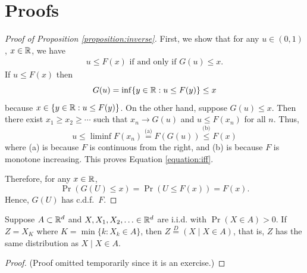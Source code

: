 \documentclass[12pt]{article}
\begin{document}
\appendix
\section*{Proofs}

\begin{proof}[Proof of Proposition \ref{proposition:inverse}]
First, we show that for any $u\in(0,1)$, $x\in\mathbb{R}$, we have 
\begin{align}\label{equation:iff}
u\leq F(x) \text{ if and only if } G(u)\leq x.
\end{align}
If $u\leq F(x)$ then
$$ G(u) =\inf\{y\in\mathbb{R}: u\leq F(y)\}\leq x $$
because $x\in\{y\in\mathbb{R}: u\leq F(y)\}$. On the other hand, suppose $G(u)\leq x$. Then there exist $x_1\geq x_2\geq \cdots$ such that $x_n\to G(u)$ and $u\leq F(x_n)$ for all $n$. Thus,
$$ u\leq\liminf F(x_n) \overset{\text{(a)}}{=} F(G(u))\overset{\text{(b)}}{\leq} F(x) $$
where (a) is because $F$ is continuous from the right, and (b) is because $F$ is monotone increasing. This proves Equation \ref{equation:iff}.

Therefore, for any $x\in\mathbb{R}$,
$$\Pr(G(U)\leq x) =\Pr(U\leq F(x)) = F(x). $$
Hence, $G(U)$ has c.d.f.\ $F$.
\end{proof}


\begin{proposition}\label{proposition:reject}
Suppose $A\subset\mathbb{R}^d$ and $X,X_1,X_2,\dotsc\in\mathbb{R}^d$ are i.i.d. with $\Pr(X\in A)>0$. If $Z = X_K$ where $K =\min\{k: X_k\in A\}$, then $Z \overset{D}{=} (X\mid X\in A)$, that is, $Z$ has the same distribution as $X\mid X\in A$.
\end{proposition}
\begin{proof}
(Proof omitted temporarily since it is an exercise.)
\end{proof}
\end{document}
